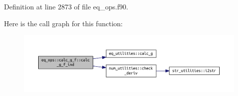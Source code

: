 Definition at line 2873 of file eq\+\_\+ops.\+f90.

Here is the call graph for this function\+:\nopagebreak
\begin{figure}[H]
\begin{center}
\leavevmode
\includegraphics[width=350pt]{interfaceeq__ops_1_1calc__g__f_a2c6ba8f85bc6ab16e69d4ec2ccaa317a_cgraph}
\end{center}
\end{figure}


